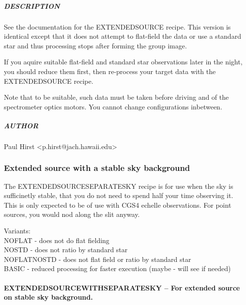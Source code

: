 \documentclass[twoside,11pt]{article}
\renewcommand{\_}{\texttt{\symbol{95}}}
\begin{document}
\subparagraph*{DESCRIPTION\label{EXTENDED_SOURCE_NOFLAT_NOSTD_--_EXTENDED_SOURCE_without_flat-fields_or_std_stars__DESCRIPTION}}

See the documentation for the EXTENDED\_SOURCE recipe. This version is
identical except that it does not attempt to flat-field the data or
use a standard star and thus processing stops after forming the group
image.



If you aquire suitable flat-field and standard star observations later
in the night, you should reduce them first, then re-process your
target data with the EXTENDED\_SOURCE recipe.



Note that to be suitable, such data must be taken before driving and
of the spectrometer optics motors. You cannot change configurations
inbetween.

\subparagraph*{AUTHOR\label{EXTENDED_SOURCE_NOFLAT_NOSTD_--_EXTENDED_SOURCE_without_flat-fields_or_std_stars__AUTHOR}}

Paul Hirst <p.hirst@jach.hawaii.edu>


\subsubsection{Extended source with a stable sky background}

The EXTENDED\_SOURCE\_SEPARATE\_SKY recipe is for use when the sky is
sufficinetly stable, that you do not need to spend half your time
observing it. This is only expected to be of use with CGS4 echelle
observations. For point sources, you would nod along the slit anyway.

Variants: \\
\_NOFLAT - does not do flat fielding \\
\_NOSTD - does not ratio by standard star \\
\_NOFLAT\_NOSTD - does not flat field or ratio by standard star \\
\_BASIC - reduced processing for faster execution (maybe - will see if needed) \\

\paragraph*{EXTENDED\_SOURCE\_WITH\_SEPARATE\_SKY -- For extended source on stable sky background.\label{EXTENDED_SOURCE_WITH_SEPARATE_SKY_--_For_extended_source_on_stable_sky_background_}}
\end{document}
